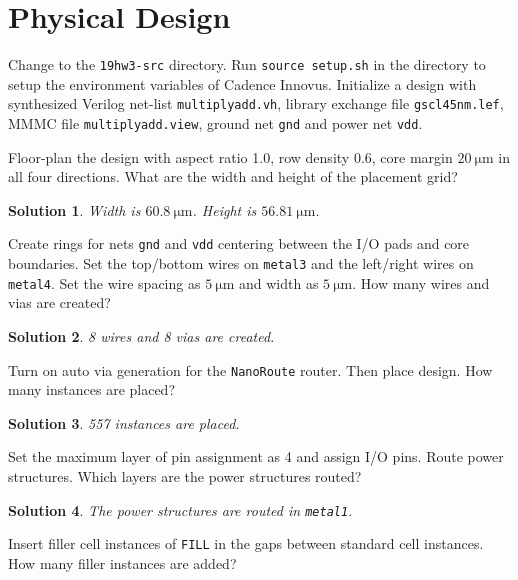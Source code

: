 \documentclass[acmlarge,screen=true,anonymous=false,11pt]{acmart}
\newtheorem*{solution*}{Solution}
\begin{document}
\section{Physical Design}
\label{sec:pd}
Change to the \texttt{19hw3-src} directory. Run \texttt{source setup.sh} in the directory to setup the environment variables of Cadence Innovus. Initialize a design with synthesized Verilog net-list \texttt{multiplyadd.vh}, library exchange file \texttt{gscl45nm.lef}, MMMC file \texttt{multiplyadd.view}, ground net \texttt{gnd} and power net \texttt{vdd}.
\begin{example}
    Floor-plan the design with aspect ratio 1.0, row density 0.6, core margin $20~\mathrm{\mu m}$ in all four directions. What are the width and height of the placement grid?
\end{example}
\begin{solution*}
    Width is $60.8~\mathrm{\mu m}$. Height is $56.81~\mathrm{\mu m}$.
\end{solution*}
\begin{example}
    Create rings for nets \texttt{gnd} and \texttt{vdd} centering between the I/O pads and core boundaries. Set the top/bottom wires on \texttt{metal3} and the left/right wires on \texttt{metal4}. Set the wire spacing as $5~\mathrm{\mu m}$ and width as $5~\mathrm{\mu m}$. How many wires and vias are created?
\end{example}
\begin{solution*}
    8 wires and 8 vias are created.
\end{solution*}
\begin{example}
    Turn on auto via generation for the \texttt{NanoRoute} router.
    Then place design. How many instances are placed?
\end{example}
\begin{solution*}
    557 instances are placed.
\end{solution*}
\begin{example}
    Set the maximum layer of pin assignment as 4 and assign I/O pins.
    Route power structures. Which layers are the power structures routed?
\end{example}
\begin{solution*}
    The power structures are routed in \texttt{metal1}.
\end{solution*}
\begin{example}
    Insert filler cell instances of \texttt{FILL} in the gaps between standard cell instances. How many filler instances are added?
\end{example}
\end{document}
